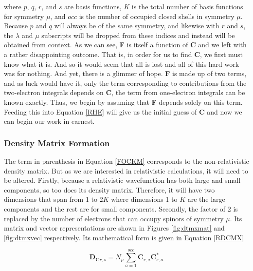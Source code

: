 \documentclass[12pt]{report}
\begin{document}
where $p$, $q$, $r$, and $s$ are basis functions, $K$ is the total number of basis functions for symmetry $\mu$, and $occ$ is the number of occupied closed shells in symmetry $\mu$. Because $p$ and $q$ will always be of the same symmetry, and likewise with $r$ and $s$, the $\lambda$ and $\mu$ subscripts will be dropped from these indices and instead will be obtained from context. As we can see, \textbf{F} is itself a function of \textbf{C} and we left with a rather disappointing outcome. That is, in order for us to find \textbf{C}, we first must know what it is. And so it would seem that all is lost and all of this hard work was for nothing. And yet, there is a glimmer of hope. \textbf{F} is made up of two terms, and as luck would have it, only the term corresponding to contributions from the two-electron integrals depends on \textbf{C}, the term from one-electron integrals can be known exactly. Thus, we begin by assuming that \textbf{F} depends solely on this term. Feeding this into Equation \ref{RHE} will give us the initial guess of \textbf{C} and now we can begin our work in earnest.

\subsubsection{Density Matrix Formation}
The term in parenthesis in Equation \ref{FOCKM} corresponds to the non-relativistic density matrix. But as we are interested in relativistic calculations, it will need to be altered. Firstly, because a relativistic wavefunction has both large and small components, so too does its density matrix. Therefore, it will have two dimensions that span from 1 to $2K$ where dimensions 1 to $K$ are the large components and the rest are for small components. Secondly, the factor of 2 is replaced by the number of electrons that can occupy spinors of symmetry $\mu$. Its matrix and vector representations are shown in Figures \ref{fig:dtmxmat} and \ref{fig:dtmxvec} respectively. Its mathematical form is given in Equation \ref{RDCMX}

\begin{equation}
\label{RDCMX}
\textbf{D$_{\textbf{C}r,s}$} =N_{\mu}\sum^{occ}_{a=1}\textbf{C}_{r,a}\textbf{C}^{*}_{s,a}
\end{equation}
\end{document}
